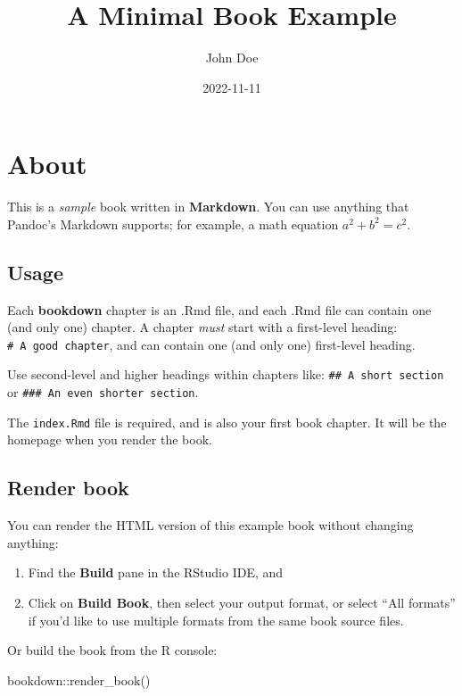 \documentclass[
  a4paper,
]{book}
\title{A Minimal Book Example}
\author{John Doe}
\date{2022-11-11}
\newenvironment{Shaded}{\begin{snugshade}}{\end{snugshade}}
\newcommand{\FunctionTok}[1]{\textcolor[rgb]{0.00,0.00,0.00}{#1}}
\newcommand{\NormalTok}[1]{#1}
\newcommand{\SpecialCharTok}[1]{\textcolor[rgb]{0.00,0.00,0.00}{#1}}
\begin{document}
\maketitle

{
\setcounter{tocdepth}{1}
\tableofcontents
}
\hypertarget{about}{%
\chapter{About}\label{about}}

This is a \emph{sample} book written in \textbf{Markdown}. You can use anything that Pandoc's Markdown supports; for example, a math equation \(a^2 + b^2 = c^2\).

\hypertarget{usage}{%
\section{Usage}\label{usage}}

Each \textbf{bookdown} chapter is an .Rmd file, and each .Rmd file can contain one (and only one) chapter. A chapter \emph{must} start with a first-level heading: \texttt{\#\ A\ good\ chapter}, and can contain one (and only one) first-level heading.

Use second-level and higher headings within chapters like: \texttt{\#\#\ A\ short\ section} or \texttt{\#\#\#\ An\ even\ shorter\ section}.

The \texttt{index.Rmd} file is required, and is also your first book chapter. It will be the homepage when you render the book.

\hypertarget{render-book}{%
\section{Render book}\label{render-book}}

You can render the HTML version of this example book without changing anything:

\begin{enumerate}
\def\labelenumi{\arabic{enumi}.}
\item
  Find the \textbf{Build} pane in the RStudio IDE, and
\item
  Click on \textbf{Build Book}, then select your output format, or select ``All formats'' if you'd like to use multiple formats from the same book source files.
\end{enumerate}

Or build the book from the R console:

\begin{Shaded}
\begin{Highlighting}[]
\NormalTok{bookdown}\SpecialCharTok{::}\FunctionTok{render\_book}\NormalTok{()}
\end{Highlighting}
\end{Shaded}
\end{document}
